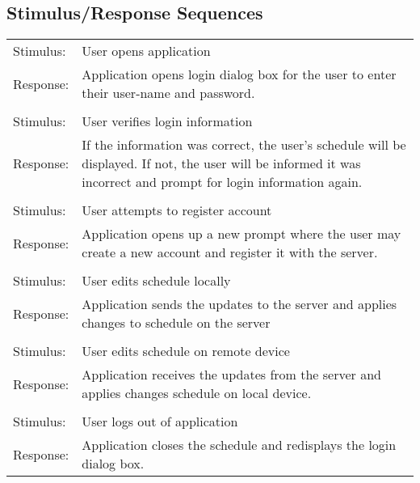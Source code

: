 \documentclass{scrreprt}
\begin{document}
\subsection{Stimulus/Response Sequences}
\begin{center}
    \begin{tabular}{ p{2cm} p{13cm} }
    Stimulus: & User opens application\\
    Response: & Application opens login dialog box for the user to enter their user-name
    and password.\\
    \\
    Stimulus: & User verifies login information\\
    Response: & If the information was correct, the user's schedule will be displayed.
    If not, the user will be informed it was incorrect and prompt for login information 
    again.\\
    \\
    Stimulus: & User attempts to register account\\
    Response: & Application opens up a new prompt where the user may create a new
    account and register it with the server.\\
    \\
    Stimulus: & User edits schedule locally\\
    Response: & Application sends the updates to the server and applies changes to 
    schedule on the server\\
    \\
    Stimulus: & User edits schedule on remote device\\
    Response: & Application receives the updates from the server and applies changes 
    schedule on local device.\\
    \\
    Stimulus: & User logs out of application\\
    Response: & Application closes the schedule and redisplays the login dialog box.\\
    \end{tabular}
\end{center}
\end{document}
